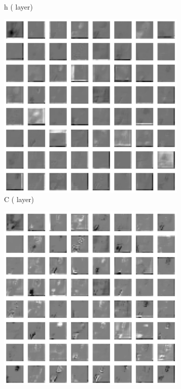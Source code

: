 \begin{figure}[h!tb]
\begin{subfigure}{0.24\textwidth}
  \caption{h \tiny{( layer)}}
  \label{fig:mm-lrep2}
  \vspace{.1cm}
\end{subfigure}
\begin{subfigure}{0.24\textwidth}
  \centering
  \includegraphics[width=0.92\linewidth]{figures/learned_rep/mm/2c.png}
  \caption{C \tiny{( layer)}}
  \label{fig:mm-lrep3}
  \vspace{.1cm}
\end{subfigure}
\begin{subfigure}{0.24\textwidth}
  \centering
  \includegraphics[width=0.92\linewidth]{figures/learned_rep/mm/2h.png}

\end{subfigure}
\end{figure}
